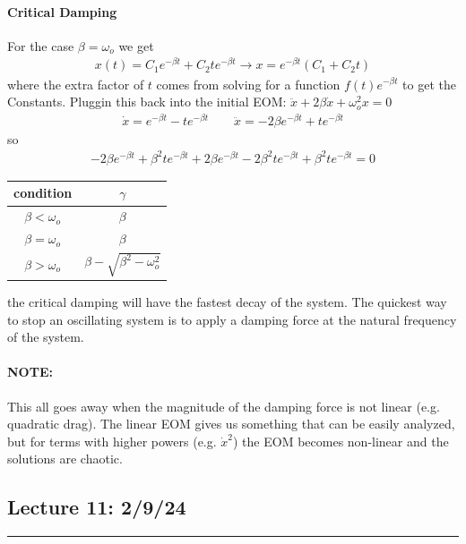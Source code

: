 \documentclass[../main.tex]{subfiles}
\begin{document}
\paragraph*{Critical Damping} For the case $\beta = \omega_o$ we get
\begin{align*}
    x(t) = C_1 e^{-\beta t} + C_2 t e^{-\beta t} \to x = e^{-\beta t}(C_1 + C_2 t)
\end{align*}
where the extra factor of $t$ comes from solving for a function $f(t)e^{-\beta t}$ to get the 
Constants. Pluggin this back into the initial EOM: $\ddot x + 2 \beta \dot x + \omega_o^2 x = 0$
\begin{align*}
    \dot x = e^{-\beta t} - t e^{-\beta t} \qquad \ddot x = -2 \beta e^{-\beta t} + t e^{-\beta t}
\end{align*}
so
\begin{align*}
    -2\beta e^{-\beta t} + \beta^2 t e^{-\beta t} + 2 \beta e^{-\beta t} - 2\beta^2 t e^{-\beta t} 
    + \beta^2 t e^{-\beta t} = 0
\end{align*}
\begin{center}
    \begin{tabular}{c | c}
        condition & $\gamma$ \\
        \hline
        $\beta < \omega_o$ & $\beta$ \\
        $\beta = \omega_o$ & $\beta$ \\
        $\beta > \omega_o$ & $\beta - \sqrt{\beta^2 - \omega_o^2} $\\        
    \end{tabular}
\end{center}
the critical damping will have the fastest decay of the system. The quickest way to stop an
oscillating system is to apply a damping force at the natural frequency of the system.

\paragraph*{NOTE:} This all goes away when the magnitude of the damping force is not linear (e.g.
quadratic drag). The linear EOM gives us something that can be easily analyzed, but for terms with
higher powers (e.g. $\dot x^2$) the EOM becomes non-linear and the solutions are chaotic.

\newpage
\subsection*{Lecture 11: \hfill  2/9/24}
\hrule \vspace{10px}
\end{document}
